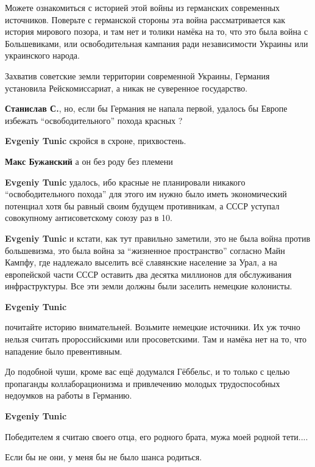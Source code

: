 \begin{itemize}
\begin{itemize}
Можете ознакомиться с историей этой войны из германских современных источников.
Поверьте с германской стороны эта война рассматривается как история мирового
позора, и там нет и толики намёка на то, что это была война с Большевиками, или
освободительная кампания ради независимости Украины или украинского народа.

Захватив советские земли территории современной Украины, Германия установила
Рейскомиссариат, а никак не суверенное государство.

\textbf{Станислав С.}, но, если бы Германия не напала первой, удалось бы Европе избежать \enquote{освободительного} похода красных ?

\textbf{Evgeniy Tunic} скройся в схроне, прихвостень.

\textbf{Макс Бужанский} а он без роду без племени

\textbf{Evgeniy Tunic} удалось, ибо красные не планировали никакого
\enquote{освободительного похода} для этого им нужно было иметь экономический потенциал
хотя бы равный своим будущем противникам, а СССР уступал совокупному
антисоветскому союзу раз в 10.

\textbf{Evgeniy Tunic} и кстати, как тут правильно заметили, это не была война
против большевизма, это была война за \enquote{жизненное пространство} согласно Майн
Кампфу, где надлежало выселить всё славянские население за Урал, а на
европейской части СССР оставить два десятка миллионов для обслуживания
инфраструктуры. Все эти земли должны были заселить немецкие колонисты.


\textbf{Evgeniy Tunic} 

почитайте историю внимательней. Возьмите немецкие источники. Их уж точно нельзя
считать пророссийскими или просоветскими. Там и намёка нет на то, что нападение
было превентивным.

До подобной чуши, кроме вас ещё додумался Гёббельс, и то только с целью
пропаганды коллаборационизма и привлечению молодых трудоспособных недоумков на
работы в Германию.


\textbf{Evgeniy Tunic}

Победителем я считаю своего отца, его родного брата, мужа моей родной тети....

Если бы не они, у меня бы не было шанса родиться.


\end{itemize}
\end{itemize}
